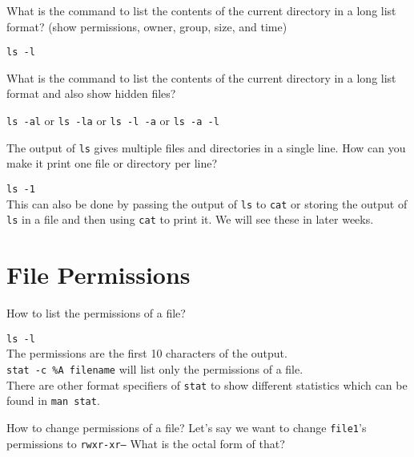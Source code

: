 \begin{qs}
  What is the command to list the contents of the current directory
  in a long list format? (show permissions, owner, group, size, and time)
\end{qs}

\begin{ans}
\texttt{ls -l}
\end{ans}

\begin{qs}
  What is the command to list the contents of the current directory
  in a long list format and also show hidden files?
\end{qs}

\begin{ans}
\texttt{ls -al} or \texttt{ls -la} or \texttt{ls -l -a} or \texttt{ls -a -l}
\end{ans}

\begin{qs}
  The output of \texttt{ls} gives multiple files and directories in a single
  line. How can you make it print one file or directory per line?
\end{qs}

\begin{ans}
  \texttt{ls -1}\\
  This can also be done by passing the output of \texttt{ls} to \texttt{cat}
  or storing the output of \texttt{ls} in a file and then using \texttt{cat}
  to print it. We will see these in later weeks.
\end{ans}

\section{File Permissions}
\begin{qs}
  How to list the permissions of a file?
\end{qs}

\begin{ans}
  \texttt{ls -l} \\
  The permissions are the first 10 characters of the output.\\
  \texttt{stat -c \%A filename} will list only the permissions of a file.\\
  There are other format specifiers of \texttt{stat} to show different statistics
  which can be found in \texttt{man stat}.
\end{ans}

\begin{qs}
  How to change permissions of a file?
  Let's say we want to change \texttt{file1}'s permissions to \texttt{rwxr-xr--}
  What is the octal form of that?
\end{qs}

